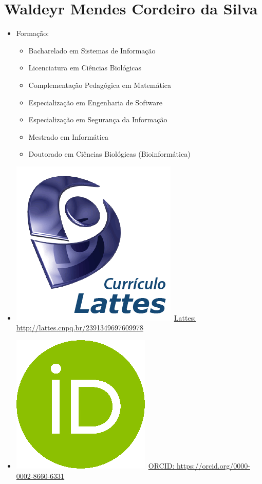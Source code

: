 \documentclass[11pt,fleqn]{book} %
\begin{document}
\section*{Waldeyr Mendes Cordeiro da Silva}\label{WaldeyrMendes}
\begin{itemize}
	\item Formação:
	\begin{itemize}
		\item Bacharelado em Sistemas de Informação
		\item Licenciatura em Ciências Biológicas
		\item Complementação Pedagógica em Matemática
		\item Especialização em Engenharia de Software
		\item Especialização em Segurança da Informação
		\item Mestrado em Informática
		\item Doutorado em Ciências Biológicas (Bioinformática)
	\end{itemize}
	\item \includegraphics[scale=.03]{Pictures/lattes}~\href{http://lattes.cnpq.br/2391349697609978}{Lattes: http://lattes.cnpq.br/2391349697609978}
	\item \includegraphics[scale=.15]{Pictures/orcid}~\href{https://orcid.org/0000-0002-8660-6331}{ORCID: https://orcid.org/0000-0002-8660-6331}
\end{itemize}
\end{document}
